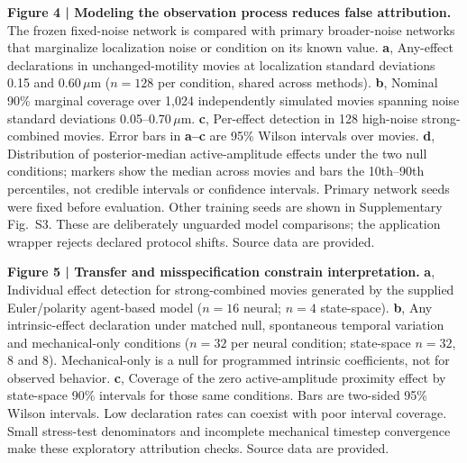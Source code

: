 \documentclass[12pt]{article}
\begin{document}
\textbf{Figure 4 | Modeling the observation process reduces false attribution.}
The frozen fixed-noise network is compared with primary broader-noise networks that marginalize localization noise or condition on its known value. \textbf{a}, Any-effect declarations in unchanged-motility movies at localization standard deviations 0.15 and 0.60\,$\mu$m ($n=128$ per condition, shared across methods). \textbf{b}, Nominal 90\% marginal coverage over 1,024 independently simulated movies spanning noise standard deviations 0.05--0.70\,$\mu$m. \textbf{c}, Per-effect detection in 128 high-noise strong-combined movies. Error bars in \textbf{a--c} are 95\% Wilson intervals over movies. \textbf{d}, Distribution of posterior-median active-amplitude effects under the two null conditions; markers show the median across movies and bars the 10th--90th percentiles, not credible intervals or confidence intervals. Primary network seeds were fixed before evaluation. Other training seeds are shown in Supplementary Fig.~S3. These are deliberately unguarded model comparisons; the application wrapper rejects declared protocol shifts. Source data are provided.

\textbf{Figure 5 | Transfer and misspecification constrain interpretation.}
\textbf{a}, Individual effect detection for strong-combined movies generated by the supplied Euler/polarity agent-based model ($n=16$ neural; $n=4$ state-space). \textbf{b}, Any intrinsic-effect declaration under matched null, spontaneous temporal variation and mechanical-only conditions ($n=32$ per neural condition; state-space $n=32$, 8 and 8). Mechanical-only is a null for programmed intrinsic coefficients, not for observed behavior. \textbf{c}, Coverage of the zero active-amplitude proximity effect by state-space 90\% intervals for those same conditions. Bars are two-sided 95\% Wilson intervals. Low declaration rates can coexist with poor interval coverage. Small stress-test denominators and incomplete mechanical timestep convergence make these exploratory attribution checks. Source data are provided.

\clearpage
\end{document}
